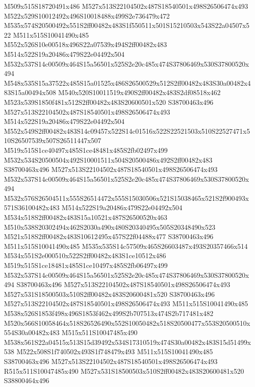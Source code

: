 \documentclass{article}
\begin{document}
\begin{multicols}{2}
M509x515S18720491x486 M527x513S22104502x487S18540501x498S26506474x493 M522x529S10012492x496S10018488x499S2e736479x472 M535x574S20500492x551S2ff00482x483S1f550511x501S15210503x543S22a04507x522 M511x515S10041490x485 M552x526S10e00518x496S22a07539x494S2ff00482x483 M514x522S19a20486x479S22e04492x504 M532x537S14c00509x464S15a56501x525S2e20c485x474S37806469x530S37800520x494 M548x535S15a37522x485S15a01525x486S26500529x512S2ff00482x483S30a00482x483S15a00494x508 M540x520S10011519x490S2ff00482x483S2df08518x462 M523x539S1850f481x512S2ff00482x483S20600501x520 S38700463x496 M527x513S22104502x487S18540501x498S26506474x493 M514x522S19a20486x479S22e04492x504 M552x549S2ff00482x483S14c09457x522S14c01516x522S22521503x510S22527471x510S26507539x507S26511447x507 M519x515S1ce40497x485S1ce48481x485S2fb02497x499 M532x534S20500504x492S10001511x504S20500486x492S2ff00482x483 S38700463x496 M527x513S22104502x487S18540501x498S26506474x493 M532x537S14c00509x464S15a56501x525S2e20c485x474S37806469x530S37800520x494 M532x576S26504511x555S26514472x555S15030506x521S15038465x521S2f900493x571S36100482x483 M514x522S19a20486x479S22e04492x504 M534x518S2ff00482x483S15a10521x487S26500520x463 M510x538S20302494x462S2030a490x480S20340495x505S20348490x523 M521x518S2ff00482x483S10612495x457S22f04488x477 S38700463x496 M511x515S10041490x485 M535x535S14c57509x465S26603487x493S20357466x514 M534x551S2e000510x522S2ff00482x483S1ce10512x486 M519x515S1ce18481x485S1ce10497x485S2fb06497x499 M532x537S14c00509x464S15a56501x525S2e20c485x474S37806469x530S37800520x494 S38700463x496 M527x513S22104502x487S18540501x498S26506474x493 M527x531S18500503x510S2ff00482x483S20600481x520 S38700463x496 M527x513S22104502x487S18540501x498S26506474x493 M511x515S10041490x485 M538x526S1853f498x496S1853f462x499S2b707513x474S2b717481x482 M520x566S10058464x518S26526490x552S10050482x518S20500477x553S20500510x554S30a00482x483 M515x511S10047485x490 M538x561S22a04515x513S15d39492x534S17310519x474S30a00482x483S15d51499x538 M522x508S1f740502x493S1f748479x493 M511x515S10041490x485 S38700463x496 M527x513S22104502x487S18540501x498S26506474x493 R515x511S10047485x490 M527x531S18500503x510S2ff00482x483S20600481x520 S38800464x496


\end{multicols}
\end{document}
